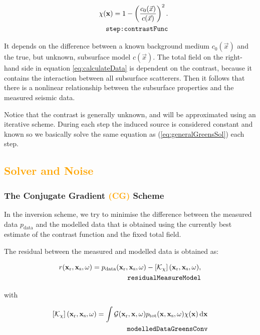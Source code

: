 \documentclass[10pt,a4paper]{article}
\newcommand{\df}[1]{\, \ensuremath{\mbox{d}#1}}
\newcommand{\xs}{\mathbf{x}_\text{s}}
\newcommand{\xr}{\mathbf{x}_\text{r}}
\newcommand{\x}{\mathbf{x}}
\begin{document}
\begin{align} \label{eq:contrastFunc}\chi(\mathbf{x}) = 1 -
\left(\frac{c_0(\vec{x})}{c(\vec{x})} \right)^2.\\
\tag*{\texttt{step:contrastFunc}}
\end{align}

It depends on the difference between a known background medium
$c_\text{0}(\vec{x})$ and the true, but unknown, subsurface model
$c(\vec{x})$. The total field on the right-hand side in equation
\ref{eq:calculateData} is dependent on the contrast, because it contains the
interaction between all subsurface scatterers. Then it follows that
there is a nonlinear relationship between the subsurface properties
and the measured seismic data.

Notice that the contrast is generally unknown, and will be
approximated using an iterative scheme. During each step the induced
source is considered constant and known so we basically solve the same
equation as (\ref{eq:generalGreensSol}) each step.
\subsection{\textcolor{orange}{Solver and Noise}}
\subsubsection{The Conjugate Gradient \textcolor{orange}{(CG)} Scheme}
\label{conjgrad}
In the inversion scheme, we try to minimise the difference between the
measured data $p_\text{data}$ and the modelled data that is obtained
using the currently best estimate of the contrast function and the
fixed total field.

The residual between the measured and modelled data is obtained as:

\begin{align} \label{eq:residualMeasureModel} r(\xr, \xs, \omega) =
p_{\text{data}}(\xr, \xs, \omega) - \left[\mathcal{K}_\chi
\right](\xr, \xs, \omega),\\
\tag*{\texttt{residualMeasureModel}}
\end{align}

with

\begin{align} \label{eq:modelledDataGreensConv} \left[\mathcal{K}_\chi \right](\xr,
\xs, \omega) = \int \mathcal{G}(\xr, \x, \omega) p_\text{tot}(\x, \xs,
\omega) \chi(\x) \df{\x}\\
\tag*{\texttt{modelledDataGreensConv}}
\end{align}
\end{document}
